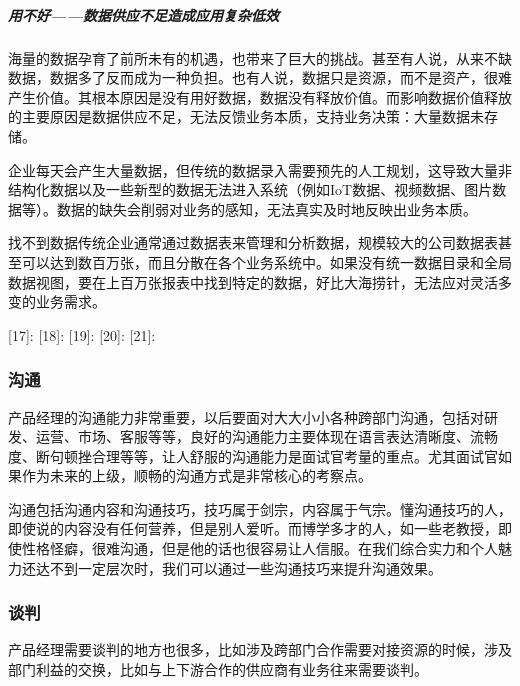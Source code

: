 \documentclass[letterpaper,10pt,english]{sphinxmanual}
\begin{document}
\subparagraph{用不好——数据供应不足造成应用复杂低效}
\label{\detokenize{chapter_idea/data:id27}}
海量的数据孕育了前所未有的机遇，也带来了巨大的挑战。甚至有人说，从来不缺数据，数据多了反而成为一种负担。也有人说，数据只是资源，而不是资产，很难产生价值。其根本原因是没有用好数据，数据没有释放价值。而影响数据价值释放的主要原因是数据供应不足，无法反馈业务本质，支持业务决策：大量数据未存储。

企业每天会产生大量数据，但传统的数据录入需要预先的人工规划，这导致大量非结构化数据以及一些新型的数据无法进入系统（例如IoT数据、视频数据、图片数据等）。数据的缺失会削弱对业务的感知，无法真实及时地反映出业务本质。

找不到数据传统企业通常通过数据表来管理和分析数据，规模较大的公司数据表甚至可以达到数百万张，而且分散在各个业务系统中。如果没有统一数据目录和全局数据视图，要在上百万张报表中找到特定的数据，好比大海捞针，无法应对灵活多变的业务需求。

{[}17{]}: {[}18{]}:
{[}19{]}:  {[}20{]}:
 {[}21{]}:


\subsubsection{沟通}
\label{\detokenize{chapter_idea/communicate:id1}}\label{\detokenize{chapter_idea/communicate::doc}}
产品经理的沟通能力非常重要，以后要面对大大小小各种跨部门沟通，包括对研发、运营、市场、客服等等，良好的沟通能力主要体现在语言表达清晰度、流畅度、断句顿挫合理等等，让人舒服的沟通能力是面试官考量的重点。尤其面试官如果作为未来的上级，顺畅的沟通方式是非常核心的考察点。

沟通包括沟通内容和沟通技巧，技巧属于剑宗，内容属于气宗。懂沟通技巧的人，即使说的内容没有任何营养，但是别人爱听。而博学多才的人，如一些老教授，即使性格怪癖，很难沟通，但是他的话也很容易让人信服。在我们综合实力和个人魅力还达不到一定层次时，我们可以通过一些沟通技巧来提升沟通效果。%
\begin{footnote}[390]\sphinxAtStartFootnote
{}
%
\end{footnote}


\subsubsection{谈判}
\label{\detokenize{chapter_idea/negotiation:id1}}\label{\detokenize{chapter_idea/negotiation::doc}}
产品经理需要谈判的地方也很多，比如涉及跨部门合作需要对接资源的时候，涉及部门利益的交换，比如与上下游合作的供应商有业务往来需要谈判。
\end{document}
